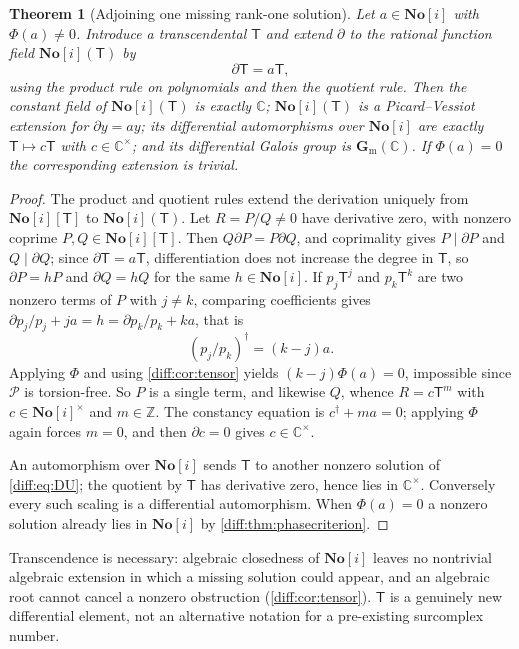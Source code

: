 \documentclass[11pt,letterpaper]{article}
\numberwithin{equation}{section}
\newtheorem{theorem}{Theorem}[section]
\theoremstyle{definition}
\theoremstyle{remark}
\newcommand{\SC}{\mathbf{No}[i]}
\newcommand{\C}{\mathbb C}
\newcommand{\Z}{\mathbb Z}
\newcommand{\der}{\partial}
\newcommand{\Pcl}{\mathcal P}
\newcommand{\gm}{\mathbf G_{\mathrm m}}
\begin{document}
\begin{theorem}[Adjoining one missing rank-one solution]
\label{diff:thm:PVone}
Let $a\in\SC$ with $\Phi(a)\neq0$. Introduce a transcendental $\mathsf T$ and extend
$\der$ to the rational function field $\SC(\mathsf T)$ by
\begin{equation}\label{diff:eq:DU}
 \der\mathsf T=a\mathsf T ,
\end{equation}
using the product rule on polynomials and then the quotient rule. Then the
constant field of $\SC(\mathsf T)$ is exactly $\C$; $\SC(\mathsf T)$ is a Picard--Vessiot
extension for $\der y=ay$; its differential automorphisms over $\SC$ are
exactly $\mathsf T\mapsto c\mathsf T$ with $c\in\C^{\times}$; and its differential Galois
group is $\gm(\C)$. If $\Phi(a)=0$ the corresponding extension is trivial.
\end{theorem}
\begin{proof}
The product and quotient rules extend the derivation uniquely from $\SC[\mathsf T]$ to
$\SC(\mathsf T)$. Let $R=P/Q\neq0$ have derivative zero, with nonzero coprime
$P,Q\in\SC[\mathsf T]$. Then $Q\der P=P\der Q$, and coprimality gives $P\mid\der P$
and $Q\mid\der Q$; since $\der\mathsf T=a\mathsf T$, differentiation does not increase the
degree in $\mathsf T$, so $\der P=hP$ and $\der Q=hQ$ for the same $h\in\SC$. If
$p_{j}\mathsf T^{j}$ and $p_{k}\mathsf T^{k}$ are two nonzero terms of $P$ with $j\neq k$,
comparing coefficients gives $\der p_{j}/p_{j}+ja=h=\der p_{k}/p_{k}+ka$, that
is
\[
 (p_{j}/p_{k})^{\dagger}=(k-j)a .
\]
Applying $\Phi$ and using \cref{diff:cor:tensor} yields
$(k-j)\Phi(a)=0$, impossible since $\Pcl$ is torsion-free. So $P$ is a single
term, and likewise $Q$, whence $R=c\mathsf T^{m}$ with $c\in\SC^{\times}$ and
$m\in\Z$. The constancy equation is $c^{\dagger}+ma=0$; applying $\Phi$ again
forces $m=0$, and then $\der c=0$ gives $c\in\C^{\times}$.

An automorphism over $\SC$ sends $\mathsf T$ to another nonzero solution of
\cref{diff:eq:DU}; the quotient by $\mathsf T$ has derivative zero, hence lies in
$\C^{\times}$. Conversely every such scaling is a differential automorphism.
When $\Phi(a)=0$ a nonzero solution already lies in $\SC$ by
\cref{diff:thm:phasecriterion}.
\end{proof}

Transcendence is necessary: algebraic closedness of $\SC$ leaves no nontrivial
algebraic extension in which a missing solution could appear, and an algebraic
root cannot cancel a nonzero obstruction (\cref{diff:cor:tensor}). $\mathsf T$ is a
genuinely new differential element, not an alternative notation for a
pre-existing surcomplex number.
\end{document}
